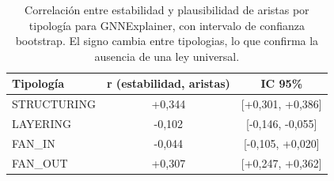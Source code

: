 \begin{table}[htbp]
\centering
\renewcommand{\arraystretch}{1.3}
\begin{tabular}{lcc}
\toprule
\textbf{Tipología} & \textbf{r (estabilidad, aristas)} & \textbf{IC 95\%} \\
\midrule
STRUCTURING & +0,344 & [+0,301, +0,386] \\
LAYERING & -0,102 & [-0,146, -0,055] \\
FAN\_IN & -0,044 & [-0,105, +0,020] \\
FAN\_OUT & +0,307 & [+0,247, +0,362] \\
\bottomrule
\end{tabular}
\caption{Correlación entre estabilidad y plausibilidad de aristas por tipología para GNNExplainer, con intervalo de confianza bootstrap. El signo cambia entre tipologias, lo que confirma la ausencia de una ley universal.}
\label{tab:synth-bridge}
\end{table}
